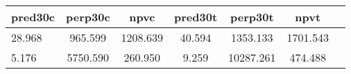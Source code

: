 \begin{table}[htbp]
\begin{tabular}{lcccccc} \hline \hline
 \multicolumn{1}{c}{ pred30c }  & perp30c  & npvc  & pred30t  & perp30t  & npvt  \\  \hline 
   28.968 &   965.599 &  1208.639 &    40.594 &  1353.133 &  1701.543 \\  
    5.176 &  5750.590 &   260.950 &     9.259 & 10287.261 &   474.488 \\  
\hline \hline \end{tabular}
\end{table}
